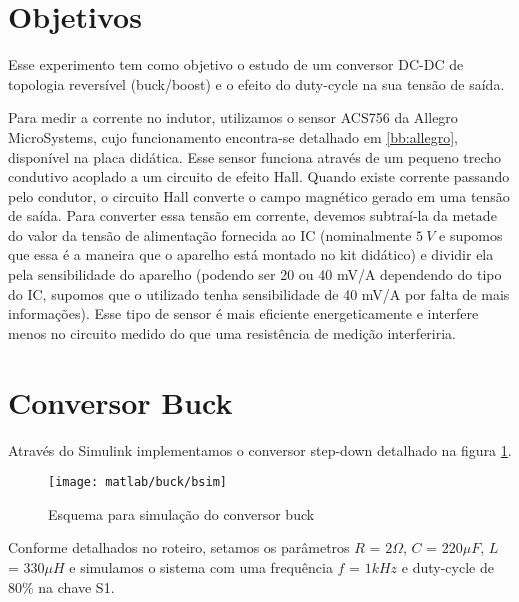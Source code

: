 \documentclass{article}
\begin{document}


\onehalfspacing
\section{Objetivos}
	Esse experimento tem como objetivo o estudo de um conversor DC-DC de topologia reversível (buck/boost) e o efeito do duty-cycle na sua tensão de saída.
	
	Para medir a corrente no indutor, utilizamos o sensor ACS756 da Allegro MicroSystems, cujo funcionamento encontra-se detalhado em \ref{bb:allegro}, disponível na placa didática. Esse sensor funciona através de um pequeno trecho condutivo acoplado a um circuito de efeito Hall. Quando existe corrente passando pelo condutor, o circuito Hall converte o campo magnético gerado em uma tensão de saída. Para converter essa tensão em corrente, devemos subtraí-la da metade do valor da tensão de alimentação fornecida ao IC (nominalmente $5\ V$ e supomos que essa é a maneira que o aparelho está montado no kit didático) e dividir ela pela sensibilidade do aparelho (podendo ser 20 ou 40 mV/A dependendo do tipo do IC, supomos que o utilizado tenha sensibilidade de 40 mV/A por falta de mais informações). Esse tipo de sensor é mais eficiente energeticamente e interfere menos no circuito medido do que uma resistência de medição interferiria.
	 
\section{Conversor Buck}
Através do Simulink implementamos o conversor step-down detalhado na figura \ref{fig:bsim}.
\begin{figure}[H]
	\centering
	\texttt{[image: matlab/buck/bsim]}
	\caption{Esquema para simulação do conversor buck}
	\label{fig:bsim}
\end{figure}
Conforme detalhados no roteiro, setamos os parâmetros $R$ = $2\Omega$, $C$ = $220\mu F$, $L$ = $330\mu H$ e simulamos o sistema com uma frequência $f$ = $1kHz$ e duty-cycle de 80\% na chave S1.
\end{document}
